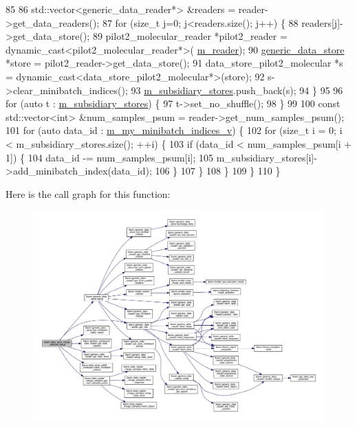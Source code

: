 \begin{DoxyCode}
85 
86     std::vector<generic\_data\_reader*> &readers = reader->get\_data\_readers();
87     \textcolor{keywordflow}{for} (\textcolor{keywordtype}{size\_t} j=0; j<readers.size(); j++) \{
88       readers[j]->get\_data\_store();
89       pilot2\_molecular\_reader *pilot2\_reader = \textcolor{keyword}{dynamic\_cast<}pilot2\_molecular\_reader*\textcolor{keyword}{>}(
      \hyperlink{classlbann_1_1generic__data__store_afa49ced0ab64c632371ea52532a91ec2}{m\_reader});
90       \hyperlink{classlbann_1_1generic__data__store_acbcd88161c06f4bb9a70bbae857d4ee0}{generic\_data\_store} *store = pilot2\_reader->get\_data\_store();
91       data\_store\_pilot2\_molecular *s = \textcolor{keyword}{dynamic\_cast<}data\_store\_pilot2\_molecular*\textcolor{keyword}{>}(store);
92       s->clear\_minibatch\_indices();
93       \hyperlink{classlbann_1_1data__store__merge__samples_a8aa1a9abc41edf0cb1a9efeac5e366aa}{m\_subsidiary\_stores}.push\_back(s);
94     \}
95 
96     \textcolor{keywordflow}{for} (\textcolor{keyword}{auto} t : \hyperlink{classlbann_1_1data__store__merge__samples_a8aa1a9abc41edf0cb1a9efeac5e366aa}{m\_subsidiary\_stores}) \{
97       t->set\_no\_shuffle();
98     \}
99 
100     \textcolor{keyword}{const} std::vector<int> &num\_samples\_psum = reader->get\_num\_samples\_psum();
101     \textcolor{keywordflow}{for} (\textcolor{keyword}{auto} data\_id : \hyperlink{classlbann_1_1generic__data__store_a41f7fec1f1f3d6568a5765be7a6784eb}{m\_my\_minibatch\_indices\_v}) \{
102       \textcolor{keywordflow}{for} (\textcolor{keywordtype}{size\_t} i = 0; i < m\_subsidiary\_stores.size(); ++i) \{
103         \textcolor{keywordflow}{if} (data\_id < num\_samples\_psum[i + 1]) \{
104           data\_id -= num\_samples\_psum[i];
105           m\_subsidiary\_stores[i]->add\_minibatch\_index(data\_id);
106         \}
107       \}
108     \}
109   \}
110 \}
\end{DoxyCode}
Here is the call graph for this function\+:\nopagebreak
\begin{figure}[H]
\begin{center}
\leavevmode
\includegraphics[width=350pt]{classlbann_1_1data__store__merge__samples_a9f7f027eab6bfb65dd8001939769f476_cgraph}
\end{center}
\end{figure}
